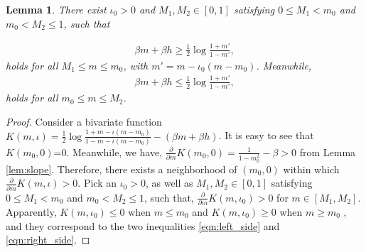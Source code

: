 \documentclass{amsart}
\newtheorem{lem}[thm]{Lemma}
\begin{document}
         \begin{lem}
         	\label{lem:right_side}
         	There exist $\iota_0>0$ and $M_1, M_2\in[0,1]$ satisfying  $0\le M_1< m_0$ and $m_0<M_2\le 1$, such that
         
         	\begin{align}
         	\label{eqn:left_side}
         	\beta m+\beta h \ge \frac12 \log \frac{1+m'}{1-m'},
         \end{align}	
         	holds for all $M_1\le m\le m_0$, with $m'=m-\iota_0 (m-m_0)$. Meanwhile,
         	\begin{align}
         		\label{eqn:right_side}
         		\beta m+\beta h \le\frac12 \log \frac{1+m'}{1-m'},
         	\end{align}	
         	holds for all $m_0\le m\le M_2$.
         \end{lem}
         \begin{proof} Consider a bivariate  function $K(m, \iota) = \frac12 \log \frac{1+m-\iota (m-m_0)}{1-m-\iota (m-m_0)}-(\beta m+\beta h )$. It is easy to see that $K(m_0, 0)$=0. Meanwhile, we have,  $\frac{\partial}{\partial m}K(m_0, 0) =\frac{1}{1-m_0^2}-\beta>0$ from Lemma \ref{lem:slope}. Therefore, there exists a neighborhood of $(m_0, 0)$ within which $\frac{\partial}{\partial m}K(m, \iota)>0$.  Pick an $\iota_0>0$, as well as $M_1, M_2\in[0,1]$ satisfying  $0\le M_1< m_0$ and $m_0<M_2\le 1$, such that, $\frac{\partial}{\partial m}K(m, \iota_0)>0$ for $m\in [M_1, M_2]$. Apparently, $K(m, \iota_0)\le 0$ when $m\le m_0$ and $K(m, \iota_0)\ge 0$ when $m\ge m_0$ , and they correspond to the two inequalities  \eqref{eqn:left_side} and \eqref{eqn:right_side}.
         \end{proof}
\end{document}
